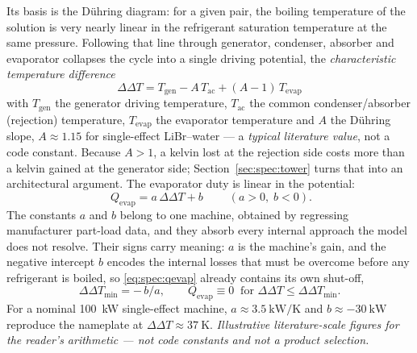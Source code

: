 Its basis is the D\"uhring diagram: for a given pair, the boiling temperature of the solution is very
nearly linear in the refrigerant saturation temperature at the same pressure. Following that line
through generator, condenser, absorber and evaporator collapses the cycle into a single driving
potential, the \emph{characteristic temperature difference}
\begin{equation}
\boxed{\;\Delta\Delta T = T_{\mathrm{gen}} - A\,T_{\mathrm{ac}} + (A-1)\,T_{\mathrm{evap}}\;}
\label{eq:spec:ddt}
\end{equation}
with $T_{\mathrm{gen}}$ the generator driving temperature, $T_{\mathrm{ac}}$ the common
condenser/absorber (rejection) temperature, $T_{\mathrm{evap}}$ the evaporator temperature and $A$ the
D\"uhring slope, $A\approx1.15$ for single-effect LiBr--water --- a \emph{typical literature value},
not a code constant. Because $A>1$, a kelvin lost at the rejection side costs more than a kelvin
gained at the generator side; Section~\ref{sec:spec:tower} turns that into an architectural argument.
The evaporator duty is linear in the potential:
\begin{equation}
\boxed{\;Q_{\mathrm{evap}} = a\,\Delta\Delta T + b\;}\qquad (a>0,\;b<0) .
\label{eq:spec:qevap}
\end{equation}
The constants $a$ and $b$ belong to one machine, obtained by regressing manufacturer part-load data,
and they absorb every internal approach the model does not resolve. Their signs carry meaning: $a$ is
the machine's gain, and the negative intercept $b$ encodes the internal losses that must be overcome
before any refrigerant is boiled, so \eqref{eq:spec:qevap} already contains its own shut-off,
\begin{equation}
\Delta\Delta T_{\min} = -\,b/a ,
\qquad Q_{\mathrm{evap}}\equiv 0 \ \text{ for } \Delta\Delta T \le \Delta\Delta T_{\min} .
\label{eq:spec:ddtmin}
\end{equation}
For a nominal \SI{100}{\kilo\watt} single-effect machine, $a\approx\SI{3.5}{\kilo\watt\per\kelvin}$
and $b\approx\SI{-30}{\kilo\watt}$ reproduce the nameplate at $\Delta\Delta T\approx\SI{37}{\kelvin}$.
\emph{Illustrative literature-scale figures for the reader's arithmetic --- not code constants and not
a product selection.}

